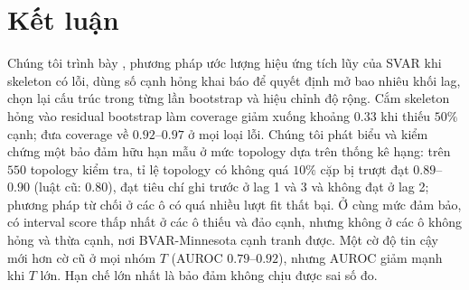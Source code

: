 \section{Kết luận}\label{sec:ket-luan}
Chúng tôi trình bày \ours{}, phương pháp ước lượng hiệu ứng tích lũy của SVAR khi skeleton có lỗi, dùng số cạnh hỏng khai báo để quyết định mở bao nhiêu khối lag, chọn lại cấu trúc trong từng lần bootstrap và hiệu chỉnh độ rộng. Cắm skeleton hỏng vào residual bootstrap làm coverage giảm xuống khoảng $0.33$ khi thiếu $50\%$ cạnh; \ours{} đưa coverage về $0.92$--$0.97$ ở mọi loại lỗi. Chúng tôi phát biểu và kiểm chứng một bảo đảm hữu hạn mẫu ở mức topology dựa trên thống kê hạng: trên $550$ topology kiểm tra, tỉ lệ topology có không quá $10\%$ cặp bị trượt đạt $0.89$--$0.90$ (luật cũ: $0.80$), đạt tiêu chí ghi trước ở lag 1 và 3 và không đạt ở lag 2; phương pháp từ chối ở các ô có quá nhiều lượt fit thất bại. Ở cùng mức đảm bảo, \ours{} có interval score thấp nhất ở các ô thiếu và đảo cạnh, nhưng không ở các ô không hỏng và thừa cạnh, nơi BVAR-Minnesota cạnh tranh được. Một cờ độ tin cậy mới hơn cờ cũ ở mọi nhóm $T$ (AUROC $0.79$--$0.92$), nhưng AUROC giảm mạnh khi $T$ lớn. Hạn chế lớn nhất là bảo đảm không chịu được sai số đo.
